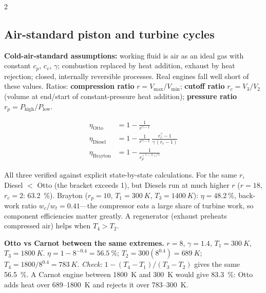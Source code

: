 \begin{multicols}{2}
\subsection{Air-standard piston and turbine cycles}\label{sec:aircycles}
\CORE{} \textbf{Cold-air-standard assumptions:} working fluid is air as an ideal gas with constant $c_p$, $c_v$, $\gamma$; combustion replaced by heat addition, exhaust by heat rejection; closed, internally reversible processes. Real engines fall well short of these values. Ratios: \textbf{compression ratio} $r=V_{\max}/V_{\min}$; \textbf{cutoff ratio} $r_c=V_3/V_2$ (volume at end/start of constant-pressure heat addition); \textbf{pressure ratio} $r_p=P_{\text{high}}/P_{\text{low}}$.
\begin{formulabox}
\vspace{-6pt}
\begin{align}
\eta_{\text{Otto}} &= 1-\frac{1}{r^{\gamma-1}} \label{F:cycle:otto}\\
\eta_{\text{Diesel}} &= 1-\frac{1}{r^{\gamma-1}}\,\frac{r_c^{\gamma}-1}{\gamma\,(r_c-1)} \label{F:cycle:diesel}\\
\eta_{\text{Brayton}} &= 1-\frac{1}{r_p^{(\gamma-1)/\gamma}} \label{F:cycle:brayton}
\end{align}
\end{formulabox}
All three verified against explicit state-by-state calculations. For the same $r$, Diesel $<$ Otto (the bracket exceeds 1), but Diesels run at much higher $r$ ($r=18$, $r_c=2$: \SI{63.2}{\percent}). Brayton ($r_p=10$, $T_1=\SI{300}{K}$, $T_3=\SI{1400}{K}$): $\eta=\SI{48.2}{\percent}$, back-work ratio $w_c/w_t=0.41$---the compressor eats a large share of turbine work, so component efficiencies matter greatly. A regenerator (exhaust preheats compressed air) helps when $T_4>T_2$.

\begin{demobox}\textbf{Otto vs Carnot between the same extremes.} $r=8$, $\gamma=1.4$, $T_1=\SI{300}{K}$, $T_3=\SI{1800}{K}$. $\eta=1-8^{-0.4}=\SI{56.5}{\percent}$; $T_2=300(8^{0.4})=\SI{689}{K}$; $T_4=1800/8^{0.4}=\SI{783}{K}$. \emph{Check:} $1-(T_4-T_1)/(T_3-T_2)$ gives the same \SI{56.5}{\percent}. A Carnot engine between \SI{1800}{K} and \SI{300}{K} would give \SI{83.3}{\percent}: Otto adds heat over \SI{689}{}--\SI{1800}{K} and rejects it over \SI{783}{}--\SI{300}{K}.\end{demobox}
\end{multicols}

